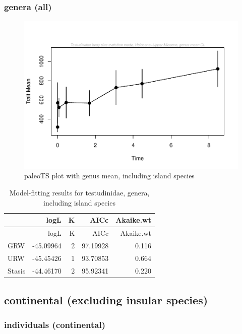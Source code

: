 \documentclass[]{article}
\begin{document}
\newpage

\subsubsection{genera (all)}\label{genera-all}

\begin{figure}[htbp]
\centering
\includegraphics{MA_JJ_files/figure-latex/paleoTS plot with genus mean, including island species-1.pdf}
\caption{paleoTS plot with genus mean, including island species}
\end{figure}

\begin{longtable}[]{@{}lrrrr@{}}
\caption{Model-fitting results for testudinidae, genera, including
island species}\tabularnewline
\toprule
& logL & K & AICc & Akaike.wt\tabularnewline
\midrule
\endfirsthead
\toprule
& logL & K & AICc & Akaike.wt\tabularnewline
\midrule
\endhead
GRW & -45.09964 & 2 & 97.19928 & 0.116\tabularnewline
URW & -45.45426 & 1 & 93.70853 & 0.664\tabularnewline
Stasis & -44.46170 & 2 & 95.92341 & 0.220\tabularnewline
\bottomrule
\end{longtable}

\newpage

\subsection{continental (excluding insular
species)}\label{continental-excluding-insular-species}

\subsubsection{individuals (continental)}\label{individuals-continental}
\end{document}

